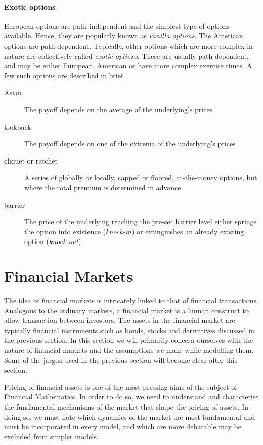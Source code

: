 \paragraph{Exotic options}
European options are path-independent and the simplest type of options available. Hence, they are popularly known as \emph{vanilla options}. The American options are path-dependent. Typically, other options which are more complex in nature are collectively called \emph{exotic options}. These are usually path-dependent, and may be either European, American or have more complex exercise times. A few such options are described in brief.
\begin{description}
	\item[Asian] The payoff depends on the average of the underlying's prices
	\item[lookback] The payoff depends on one of the extrema of the underlying's prices
	\item[cliquet or ratchet] A series of globally or locally, capped or floored, at-the-money options, but where the total premium is determined in advance.
	\item[barrier] The price of the underlying reaching the pre-set barrier level either springs the option into existence (\emph{knock-in}) or extinguishes an already existing option (\emph{knock-out}).
\end{description}



\section{Financial Markets}
\label{sec:intro-market}

The idea of financial markets is intricately linked to that of financial transactions. Analogous to the ordinary markets, a financial market is a human construct to allow transaction between investors. The assets in the financial market are typically financial instruments such as bonds, stocks and derivatives discussed in the previous section. In this section we will primarily concern ourselves with the nature of financial markets and the assumptions we make while modelling them. Some of the jargon used in the previous section will become clear after this section.

Pricing of financial assets is one of the most pressing aims of the subject of Financial Mathematics. In order to do so, we need to understand and characterise the fundamental mechanisms of the market that shape the pricing of assets. In doing so, we must note which dynamics of the market are most fundamental and must be incorporated in every model, and which are more debatable may be excluded from simpler models.

